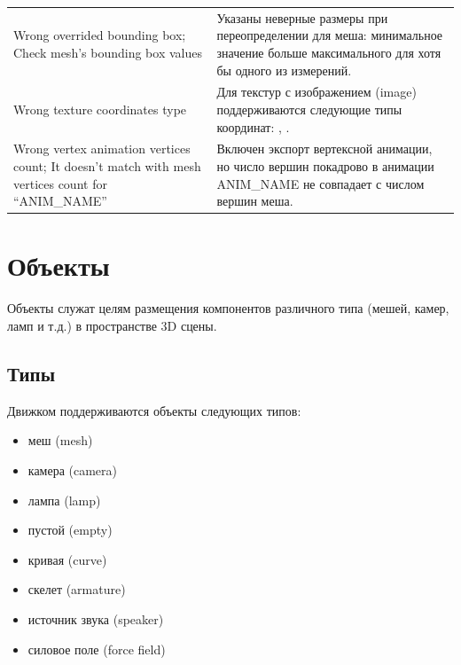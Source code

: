 \documentclass[a4paper,12pt,oneside]{sphinxmanual}
\begin{document}
\begin{tabulary}{\linewidth}{|L|L|}
Wrong overrided bounding box; Check
mesh's bounding box values
 & 
Указаны неверные размеры при
переопределении  для меша:
минимальное значение больше максимального
для хотя бы одного из измерений.
\\

Wrong texture coordinates type
 & 
Для текстур с изображением (image)
поддерживаются следующие типы координат:
, .
\\

Wrong vertex animation vertices
count; It doesn't match with mesh
vertices count for ``ANIM\_NAME''
 & 
Включен экспорт вертексной анимации, но
число вершин покадрово в анимации
ANIM\_NAME не совпадает с числом вершин
меша.
\\
\hline\end{tabulary}



\chapter{Объекты}
\label{objects:objects}\label{objects::doc}\label{objects:id1}
Объекты служат целям размещения компонентов различного типа (мешей, камер, ламп и т.д.) в пространстве 3D сцены.


\section{Типы}
\label{objects:id2}
Движком поддерживаются объекты следующих типов:
\begin{itemize}
\item {} 
меш (mesh)

\item {} 
камера (camera)

\item {} 
лампа (lamp)

\item {} 
пустой (empty)

\item {} 
кривая (curve)

\item {} 
скелет (armature)

\item {} 
источник звука (speaker)

\item {} 
силовое поле (force field)

\end{itemize}
\end{document}
